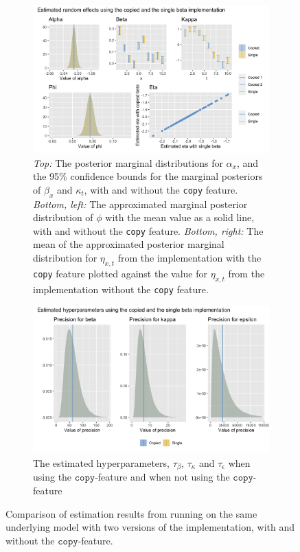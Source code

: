 \begin{figure}[h!]
    \centering
    \begin{subfigure}[b]{0.85\textwidth}
        \includegraphics[width=\textwidth]{synthetic-data/Figures/copy-beta.png}
        \caption{\textit{Top:} The posterior marginal distributions for $\alpha_x$, and the 95\% confidence bounds for the marginal posteriors of $\beta_x$ and $\kappa_t$, with and without the \texttt{copy} feature. \textit{Bottom, left:} The approximated marginal posterior distribution of $\phi$ with the mean value as a solid line, with and without the \texttt{copy} feature. \textit{Bottom, right:} The mean of the approximated posterior marginal distribution for $\eta_{x,t}$ from the implementation with the \texttt{copy} feature plotted against the value for $\eta_{x,t}$ from the implementation without the \texttt{copy} feature. }
        \label{fig:copyBetaComparison-top}
    \end{subfigure}
    
    \begin{subfigure}[b]{0.6\textwidth}
        \includegraphics[width=\textwidth]{synthetic-data/Figures/hyperparameters-LC-copy.png}
        \caption{The estimated hyperparameters, $\tau_\beta$, $\tau_\kappa$ and $\tau_\epsilon$ when using the $\texttt{copy}$-feature and when not using the $\texttt{copy}$-feature}
        \label{fig:copyBetaComparison-bottom}
    \end{subfigure}
    \caption{Comparison of estimation results from running \inlabru on the same underlying model with two versions of the implementation, with and without the $\texttt{copy}$-feature.}
    \label{fig:copyBetaComparison}
\end{figure}

